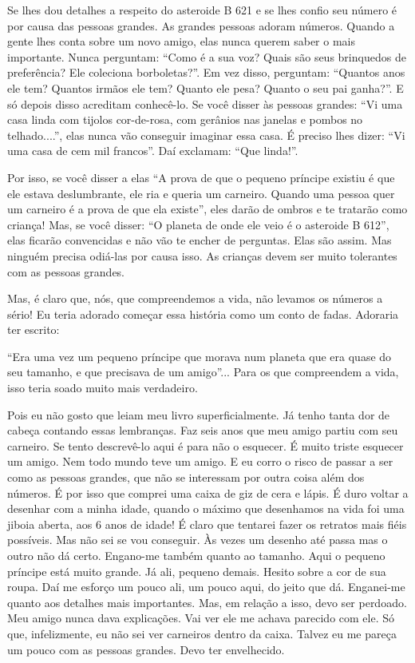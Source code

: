 Se lhes dou detalhes a respeito do asteroide B 621 e se lhes confio seu
número é por causa das pessoas grandes. As grandes pessoas adoram
números. Quando a gente lhes conta sobre um novo amigo, elas nunca
querem saber o mais importante. Nunca perguntam: ``Como é a sua voz?
Quais são seus brinquedos de preferência? Ele coleciona borboletas?''.
Em vez disso, perguntam: ``Quantos anos ele tem? Quantos irmãos ele tem?
Quanto ele pesa? Quanto o seu pai ganha?''. E só depois disso acreditam
conhecê-lo. Se você disser às pessoas grandes: ``Vi uma casa linda com
tijolos cor-de-rosa, com gerânios nas janelas e pombos no telhado....'',
elas nunca vão conseguir imaginar essa casa. É preciso lhes dizer: ``Vi
uma casa de cem mil francos''. Daí exclamam: ``Que linda!''.

Por isso, se você disser a elas ``A prova de que o pequeno príncipe
existiu é que ele estava deslumbrante, ele ria e queria um carneiro.
Quando uma pessoa quer um carneiro é a prova de que ela existe'', eles
darão de ombros e te tratarão como criança! Mas, se você disser: ``O
planeta de onde ele veio é o asteroide B 612'', elas ficarão convencidas
e não vão te encher de perguntas. Elas são assim. Mas ninguém precisa
odiá-las por causa isso. As crianças devem ser muito tolerantes com as
pessoas grandes.

Mas, é claro que, nós, que compreendemos a vida, não levamos os números
a sério! Eu teria adorado começar essa história como um conto de fadas.
Adoraria ter escrito:

``Era uma vez um pequeno príncipe que morava num planeta que era quase
do seu tamanho, e que precisava de um amigo''... Para os que compreendem
a vida, isso teria soado muito mais verdadeiro.

Pois eu não gosto que leiam meu livro superficialmente. Já tenho tanta
dor de cabeça contando essas lembranças. Faz seis anos que meu amigo
partiu com seu carneiro. Se tento descrevê-lo aqui é para não o
esquecer. É muito triste esquecer um amigo. Nem todo mundo teve um
amigo. E eu corro o risco de passar a ser como as pessoas grandes, que
não se interessam por outra coisa além dos números. É por isso que
comprei uma caixa de giz de cera e lápis. É duro voltar a desenhar com a
minha idade, quando o máximo que desenhamos na vida foi uma jiboia
aberta, aos 6 anos de idade! É claro que tentarei fazer os retratos mais
fiéis possíveis. Mas não sei se vou conseguir. Às vezes um desenho até
passa mas o outro não dá certo. Engano-me também quanto ao tamanho. Aqui
o pequeno príncipe está muito grande. Já ali, pequeno demais. Hesito
sobre a cor de sua roupa. Daí me esforço um pouco ali, um pouco aqui, do
jeito que dá. Enganei-me quanto aos detalhes mais importantes. Mas, em
relação a isso, devo ser perdoado. Meu amigo nunca dava explicações. Vai
ver ele me achava parecido com ele. Só que, infelizmente, eu não sei ver
carneiros dentro da caixa. Talvez eu me pareça um pouco com as pessoas
grandes. Devo ter envelhecido.

